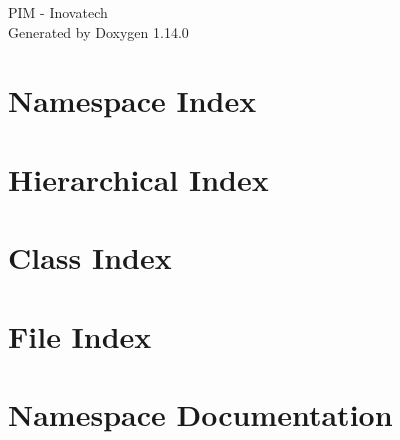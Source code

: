 \documentclass[twoside]{book}
\newcommand{\+}{\discretionary{\mbox{\scriptsize$\hookleftarrow$}}{}{}}
\newcommand{\clearemptydoublepage}{%
    \newpage{\pagestyle{empty}\cleardoublepage}%
  }
\begin{document}
  \raggedbottom
    \hypersetup{pageanchor=false,
                bookmarksnumbered=true,
                pdfencoding=unicode
               }
  \begin{titlepage}
  \vspace*{7cm}
  \begin{center}%
  {\Large PIM -\/ Inovatech}\\
  \vspace*{1cm}
  {\large Generated by Doxygen 1.14.0}\\
  \end{center}
  \end{titlepage}
  \clearemptydoublepage
  \tableofcontents
  \clearemptydoublepage
  \hypersetup{pageanchor=true}


\chapter{Namespace Index}

\chapter{Hierarchical Index}

\chapter{Class Index}

\chapter{File Index}

\chapter{Namespace Documentation}






\end{document}
